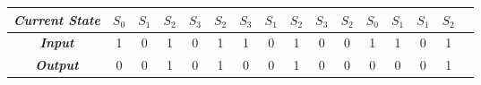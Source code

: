 \begin{tabular}{|c|c|c|c|c|c|c|c|c|c|c|c|c|c|c|c|}
\hline
\textit{\textbf{Current State}} &\textit{\textbf{$S_0$}}  & \textit{\textbf{$S_1$}} & \textit{\textbf{$S_2$}} & \textit{\textbf{$S_3$}}&\textit{\textbf{$S_2$}} &\textit{\textbf{$S_3$}} &\textit{$S_1$} &\textit{$S_2$} &\textit{$S_3$} &\textit{$S_2$} &\textit{$S_0$} &\textit{$S_1$} &\textit{$S_1$}&\textit{$S_2$}  \\\hline
\textit{\textbf{Input}}         &    1                   &    0                    &   1                     &   0                    &   1                    &   1                    &   0            &   1           &   0           &   0           &   1           &   1           &   0          &    1            \\\hline
\textit{\textbf{Output}}        &    0                   &    0                    &   1                     &   0                    &   1                    &   0                    &   0            &   1           &   0           &   0           &   0           &   0           &   0          &    1           \\\hline
\end{tabular}